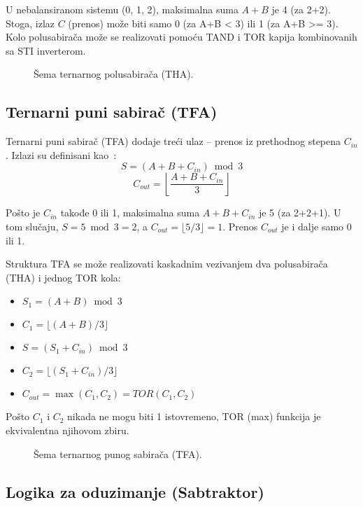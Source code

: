 \documentclass[conference,a4paper]{IEEEtran}
\begin{document}
	U nebalansiranom sistemu (0, 1, 2), maksimalna suma $A+B$ je 4 (za 2+2). Stoga, izlaz $C$ (prenos) može biti samo 0 (za A+B < 3) ili 1 (za A+B >= 3).
	Kolo polusabirača može se realizovati pomoću TAND i TOR kapija kombinovanih sa STI inverterom.
	
	\begin{figure}[htbp]
		\centering
		\caption{Šema ternarnog polusabirača (THA).}
		\label{fig:tha}
	\end{figure}
	
	\subsection{Ternarni puni sabirač (TFA)}
	
	Ternarni puni sabirač (TFA) dodaje treći ulaz – prenos iz prethodnog stepena $C_{in}$.
	Izlazi su definisani kao~\cite{jones_arith}:
	\begin{equation}
		S = (A + B + C_{in}) \bmod 3
	\end{equation}
	\begin{equation}
		C_{out} = \left\lfloor \frac{A + B + C_{in}}{3} \right\rfloor
	\end{equation}
	
	Pošto je $C_{in}$ takođe 0 ili 1, maksimalna suma $A + B + C_{in}$ je 5 (za 2+2+1). U tom slučaju, $S = 5 \bmod 3 = 2$, a $C_{out} = \lfloor 5/3 \rfloor = 1$. Prenos $C_{out}$ je i dalje samo 0 ili 1.
	
	Struktura TFA se može realizovati kaskadnim vezivanjem dva polusabirača (THA) i jednog TOR kola:
	\begin{itemize}
		\item $S_1 = (A + B) \bmod 3$
		\item $C_1 = \lfloor (A + B) / 3 \rfloor$
		\item $S = (S_1 + C_{in}) \bmod 3$
		\item $C_2 = \lfloor (S_1 + C_{in}) / 3 \rfloor$
		\item $C_{out} = \max(C_1, C_2) = TOR(C_1, C_2)$
	\end{itemize}
	Pošto $C_1$ i $C_2$ nikada ne mogu biti 1 istovremeno, TOR (max) funkcija je ekvivalentna njihovom zbiru.
	
	\begin{figure}[htbp]
		\centering

		\caption{Šema ternarnog punog sabirača (TFA).}
		\label{fig:tfa}
	\end{figure}
	
	\subsection{Logika za oduzimanje (Sabtraktor)}
	
\end{document}
